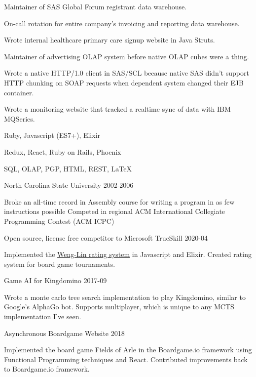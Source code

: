\documentclass[11pt,english]{article}
\begin{document}
\begin{description}
Maintainer of SAS Global Forum registrant data warehouse.

On-call rotation for entire company's invoicing and reporting data warehouse.

Wrote internal healthcare primary care signup website in Java Struts.

Maintainer of advertising OLAP system before native OLAP cubes were a thing.

Wrote a native HTTP/1.0 client in SAS/SCL because native SAS didn't support HTTP chunking on SOAP requests when dependent system changed their EJB container.

Wrote a monitoring website that tracked a realtime sync of data with IBM MQSeries.

\end{description}


      {Ruby, Javascript (ES7+), Elixir}

      {Redux, React, Ruby on Rails, Phoenix}

      {SQL, OLAP, PGP, HTML, REST, \LaTeX}


\begin{description}
\squish
{} {North Carolina State University}
           {2002-2006}
 
Broke an all-time record in Assembly course for writing a program in as few instructions possible
Competed in regional ACM International Collegiate Programming Contest (ACM ICPC)

\end{description}


\begin{description}
\squish

           {Open source, license free competitor to Microsoft TrueSkill}
           {2020-04}

Implemented the \href{https://www.csie.ntu.edu.tw/~cjlin/papers/online_ranking/online_journal.pdf}{Weng-Lin rating system} in Javascript and Elixir. Created rating system for board game tournaments.

           {Game AI for Kingdomino}
           {2017-09}

Wrote a monte carlo tree search implementation to play Kingdomino, similar to
Google's AlphaGo bot. Supports multiplayer, which is unique to any MCTS
implementation I've seen.

           {Asynchronous Boardgame Website}
           {2018}

Implemented the board game Fields of Arle in the Boardgame.io framework using Functional Programming techniques and React. Contributed improvements back to Boardgame.io framework.


\end{description}
\end{document}
